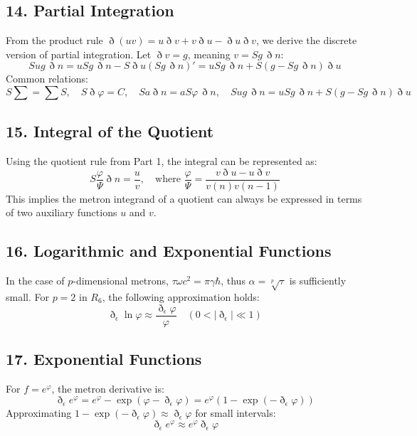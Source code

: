 \documentclass[11pt,a4paper,oneside]{article}
\begin{document}
\subsection{14. Partial Integration}

From the product rule $\eth (uv) = u \eth v + v \eth u - \eth u \eth v$, we derive the discrete version of partial integration. Let $\eth v = g$, meaning $v = S g \, \eth n$:
\begin{equation*}
    S u g \, \eth n = u S g \, \eth n - S \eth u (S g \, \eth n)' = u S g \, \eth n + S (g - S g \, \eth n) \eth u
\end{equation*}
Common relations:
\begin{equation}
    S \sum = \sum S, \quad S \eth \varphi = C, \quad S a \eth n = a S \varphi \, \eth n, \quad S u g \, \eth n = u S g \, \eth n + S (g - S g \, \eth n) \eth u \tag{M6}
\end{equation}

\subsection{15. Integral of the Quotient}

Using the quotient rule from Part 1, the integral can be represented as:
\begin{equation}
    S \frac{\varphi}{\Psi} \eth n = \frac{u}{v}, \quad \text{where } \frac{\varphi}{\Psi} = \frac{v \eth u - u \eth v}{v(n)v(n-1)} \tag{M6a}
\end{equation}
This implies the metron integrand of a quotient can always be expressed in terms of two auxiliary functions $u$ and $v$.

\subsection{16. Logarithmic and Exponential Functions}

In the case of $p$-dimensional metrons, $\tau \omega c^2 = \pi \gamma \hbar$, thus $\alpha = \sqrt[p]{\tau}$ is sufficiently small. For $p=2$ in $R_6$, the following approximation holds:
\begin{equation*}
    \eth_\epsilon \ln \varphi \approx \frac{\eth_\epsilon \varphi}{\varphi} \quad (0 < |\eth_\epsilon| \ll 1)
\end{equation*}

\subsection{17. Exponential Functions}
For $f = e^\varphi$, the metron derivative is:
\begin{equation*}
    \eth_\epsilon e^\varphi = e^\varphi - \exp(\varphi - \eth_\epsilon \varphi) = e^\varphi(1 - \exp(-\eth_\epsilon \varphi))
\end{equation*}
Approximating $1 - \exp(-\eth_\epsilon \varphi) \approx \eth_\epsilon \varphi$ for small intervals:
\begin{equation}
    \eth_\epsilon e^\varphi \approx e^\varphi \eth_\epsilon \varphi
\end{equation}
\end{document}
